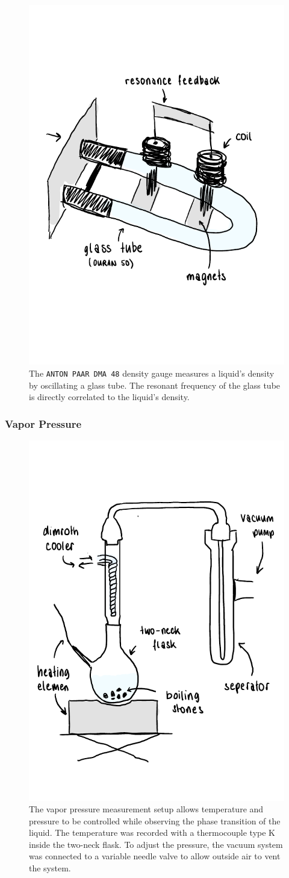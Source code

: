\begin{figure}[H]
    \centering
    \includegraphics[width=.5\textwidth]{figures/sketch_density_meter.pdf}
    \caption{The \texttt{ANTON PAAR DMA 48} density gauge measures a liquid's density by oscillating a glass tube. The resonant frequency of the glass tube is directly correlated to the liquid's density.}
    \label{fig:sketch_rho}
\end{figure}



\subsubsection{Vapor Pressure}

\begin{figure}[H]
    \centering
    \includegraphics[width=.5\textwidth]{figures/ddr_sketch_setup.pdf}
    \caption{The vapor pressure measurement setup allows temperature and pressure to be controlled while observing the phase transition of the liquid. The temperature was recorded with a thermocouple type K inside the two-neck flask. To adjust the pressure, the vacuum system was connected to a variable needle valve to allow outside air to vent the system.}
    \label{fig:sketch_setup}
\end{figure}

